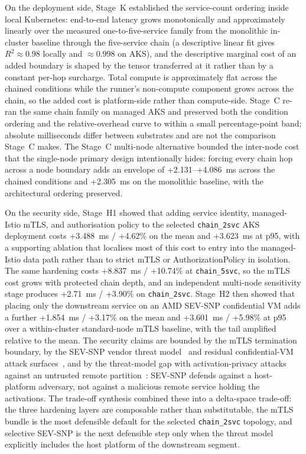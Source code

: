 On the deployment side, Stage~K established the service-count ordering
inside local Kubernetes: end-to-end latency grows
monotonically and approximately linearly over the measured one-to-five-service
family from the
monolithic in-cluster baseline through the five-service chain (a
descriptive linear fit gives $R^{2}\approx0.98$ locally and $\approx0.998$
on AKS), and the descriptive marginal cost of an added boundary is
shaped by the tensor transferred at it rather than by a constant
per-hop surcharge. Total compute is approximately flat across the
chained conditions while the runner's non-compute component grows
across the chain, so the added cost is platform-side rather than
compute-side. Stage~C re-ran the same chain family on managed AKS and
preserved both the condition ordering and the relative-overhead curve
to within a small percentage-point band; absolute milliseconds differ
between substrates and are not the comparison Stage~C makes. The Stage~C multi-node alternative bounded the inter-node cost
that the single-node primary design
intentionally hides: forcing every chain hop across a node boundary
adds an envelope of +2.131--+4.086~ms across the chained conditions
and +2.305~ms on the monolithic baseline, with the architectural
ordering preserved.

On the security side, Stage~H1 showed that adding service identity,
managed-Istio mTLS, and authorisation policy to the selected
\texttt{chain\_2svc} AKS deployment costs +3.488~ms / +4.62\% on the
mean and +3.623~ms at p95, with a supporting ablation that localises
most of this cost to entry into the managed-Istio data path rather
than to strict mTLS or AuthorizationPolicy in isolation. The same
hardening costs +8.837~ms / +10.74\% at \texttt{chain\_5svc}, so the
mTLS cost grows with protected chain depth, and an independent
multi-node sensitivity stage produces +2.71~ms / +3.90\% on
\texttt{chain\_2svc}. Stage~H2 then showed that placing only the
downstream service on an AMD SEV-SNP confidential VM adds a further
+1.854~ms / +3.17\% on the mean and +3.601~ms / +5.98\% at p95 over
a within-cluster standard-node mTLS baseline, with the tail amplified
relative to the mean. The security claims are bounded by the
mTLS termination boundary, by the SEV-SNP vendor threat
model~\cite{amd_sevsnp_whitepaper} and residual confidential-VM attack
surfaces~\cite{schluter2024_heckler}, and by the threat-model gap with
activation-privacy attacks against an untrusted remote
partition~\cite{he2021_attacking_collaborative}: SEV-SNP defends
against a host-platform adversary, not against a malicious remote
service holding the activations. The trade-off synthesis combined these into a
delta-space trade-off: the three hardening layers are composable
rather than substitutable, the mTLS bundle is the most defensible
default for the selected \texttt{chain\_2svc} topology, and selective
SEV-SNP is the next defensible step only when the threat model
explicitly includes the host platform of the downstream segment.

